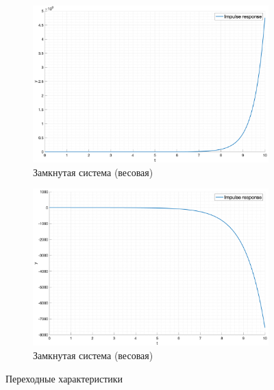\begin{figure}[ht!]
\begin{subfigure}{0.5\textwidth}
        \label{fig:task1_step:closed}
    \end{subfigure}
    \begin{subfigure}{0.5\textwidth}
        \includegraphics[width=\textwidth]{media/plots/task1_impulse_response_open.png}
        \caption{Замкнутая система (весовая)}
        \label{fig:task1_impulse:open}
    \end{subfigure}%
    \begin{subfigure}{0.5\textwidth}
        \includegraphics[width=\textwidth]{media/plots/task1_impulse_response_closed.png}
        \caption{Замкнутая система (весовая)}
        \label{fig:task1_impulse:closed}
    \end{subfigure}
    \caption{Переходные характеристики}
    \label{fig:task1_respoces}
\end{figure}

